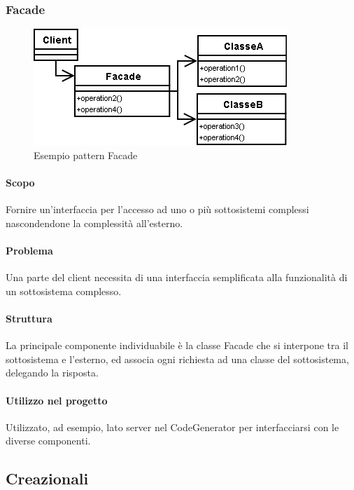 \documentclass[../PianoDiQualifica.tex]{subfiles}
\begin{document}
			\subsubsection{Facade}
				\begin{figure}[H] \label{fig:Facade}
					\centering
					\includegraphics[scale=0.8]{Immagini/FacadeEx.png}
					\caption{Esempio pattern Facade}
				\end{figure}
				\paragraph{Scopo\\}
					Fornire un'interfaccia per l'accesso ad uno o più sottosistemi complessi
					nascondendone la complessità all'esterno.
				\paragraph{Problema\\}
					Una parte del client necessita di una interfaccia semplificata alla funzionalità
					di un sottosistema complesso.
				\paragraph{Struttura\\}
					La principale componente individuabile è la classe Facade che si interpone tra il
					sottosistema e l'esterno, ed associa ogni richiesta ad una classe del sottosistema,
					delegando la risposta.
				\paragraph{Utilizzo nel progetto\\}
					Utilizzato, ad esempio, lato server nel CodeGenerator per interfacciarsi con
					le diverse componenti.
		\subsection{Creazionali}
\end{document}
